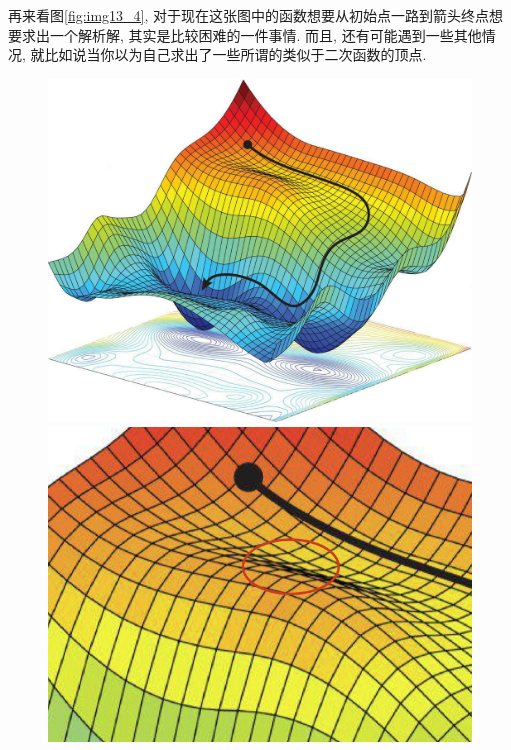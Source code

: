 再来看图\ref{fig:img13_4}, 对于现在这张图中的函数想要从初始点一路到箭头终点想要求出一个解析解, 其实是比较困难的一件事情. 而且, 还有可能遇到一些其他情况, 就比如说当你以为自己求出了一些所谓的类似于二次函数的顶点.

\begin{figure}[ht]
  \begin{minipage}[t]{0.48\textwidth}
    \centering
    \includegraphics[width=\textwidth]{asset/20230902174547.png}
    \caption{}
    \label{fig:img13_4}
  \end{minipage} %
  \hspace{1em}
  \begin{minipage}[t]{0.48\textwidth}
    \centering
    \includegraphics[width=\textwidth]{asset/20230902174840.png}
    \caption{}
    \label{fig:img13_5}
  \end{minipage}
\end{figure}

